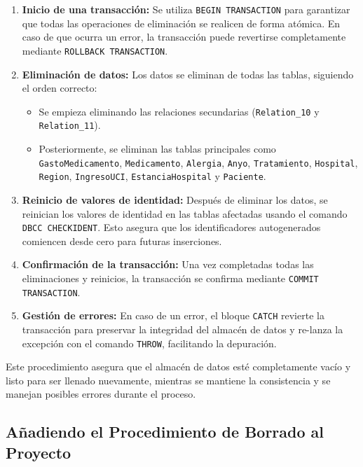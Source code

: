 \documentclass{article}
\begin{document}
	\begin{enumerate}
		\item \textbf{Inicio de una transacción:} Se utiliza \texttt{BEGIN TRANSACTION} para garantizar que todas las operaciones de eliminación se realicen de forma atómica. En caso de que ocurra un error, la transacción puede revertirse completamente mediante \texttt{ROLLBACK TRANSACTION}.
		
		\item \textbf{Eliminación de datos:} Los datos se eliminan de todas las tablas, siguiendo el orden correcto:
		\begin{itemize}
			\item Se empieza eliminando las relaciones secundarias (\texttt{Relation\_10} y \texttt{Relation\_11}).
			\item Posteriormente, se eliminan las tablas principales como \texttt{GastoMedicamento}, \texttt{Medicamento}, \texttt{Alergia}, \texttt{Anyo}, \texttt{Tratamiento}, \texttt{Hospital}, \texttt{Region}, \texttt{IngresoUCI}, \texttt{EstanciaHospital} y \texttt{Paciente}.
		\end{itemize}
		
		\item \textbf{Reinicio de valores de identidad:} Después de eliminar los datos, se reinician los valores de identidad en las tablas afectadas usando el comando \texttt{DBCC CHECKIDENT}. Esto asegura que los identificadores autogenerados comiencen desde cero para futuras inserciones.
		
		\item \textbf{Confirmación de la transacción:} Una vez completadas todas las eliminaciones y reinicios, la transacción se confirma mediante \texttt{COMMIT TRANSACTION}.
		
		\item \textbf{Gestión de errores:} En caso de un error, el bloque \texttt{CATCH} revierte la transacción para preservar la integridad del almacén de datos y re-lanza la excepción con el comando \texttt{THROW}, facilitando la depuración.
	\end{enumerate}
	
	Este procedimiento asegura que el almacén de datos esté completamente vacío y listo para ser llenado nuevamente, mientras se mantiene la consistencia y se manejan posibles errores durante el proceso.
	
	\subsection{Añadiendo el Procedimiento de Borrado al Proyecto}
	
\end{document}
